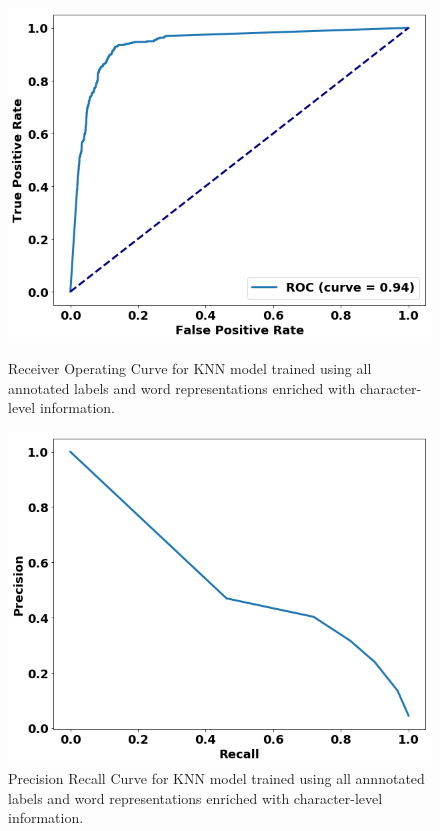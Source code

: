 \begin{figure}
\begin{minipage}[b]{.4\textwidth}
\end{minipage}
\centering
\begin{minipage}[b]{.4\textwidth}
\includegraphics[trim=0in 0.1in 0.1in 0.in,clip,width=1.0\textwidth]{figures/roc_all.png}
\caption{Receiver Operating Curve for KNN model trained using all annotated labels and word representations enriched with character-level information.}\label{fig:all_rocs_fasttext}
\end{minipage}\qquad
\begin{minipage}[b]{.4\textwidth}
\includegraphics[trim=0in 0.1in 0.1in 0.in,clip,width=1.0\textwidth]{figures/prc_all.png}
\caption{Precision Recall Curve for KNN model trained using all annnotated labels and word representations enriched with character-level information.}\label{fig:all_prcs_fasttext}
\end{minipage}
\end{figure}


